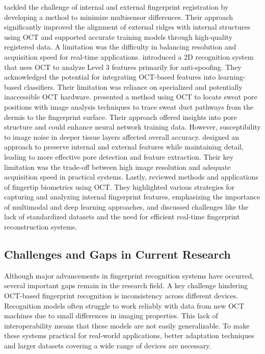 \textcite{yuNewApproachExternal2020} tackled the challenge of internal and external fingerprint registration by developing a method to minimize multisensor differences. Their approach significantly improved the alignment of external ridges with internal structures using OCT and supported accurate training models through high-quality registered data. A limitation was the difficulty in balancing resolution and acquisition speed for real-time applications. \textcite{liuRobustHighsecurityFingerprint2020} introduced a 2D recognition system that uses OCT to analyze Level 3 features primarily for anti-spoofing. They acknowledged the potential for integrating OCT-based features into learning-based classifiers. Their limitation was reliance on specialized and potentially inaccessible OCT hardware. \textcite{dingSubcutaneousSweatPore2021} presented a method using OCT to locate sweat pore positions with image analysis techniques to trace sweat duct pathways from the dermis to the fingerprint surface. Their approach offered insights into pore structure and could enhance neural network training data. However, susceptibility to image noise in deeper tissue layers affected overall accuracy. \textcite{liuNovelHighResolutionFingerprint2022} designed an approach to preserve internal and external features while maintaining detail, leading to more effective pore detection and feature extraction. Their key limitation was the trade-off between high image resolution and adequate acquisition speed in practical systems. Lastly, \textcite{sunNewApproachAutomated2023} reviewed methods and applications of fingertip biometrics using OCT. They highlighted various strategies for capturing and analyzing internal fingerprint features, emphasizing the importance of multimodal and deep learning approaches, and discussed challenges like the lack of standardized datasets and the need for efficient real-time fingerprint reconstruction systems.
\subsection{Challenges and Gaps in Current Research}
Although major advancements in fingerprint recognition systems have occurred, several important gaps remain in the research field. A key challenge hindering OCT-based fingerprint recognition is inconsistency across different devices. Recognition models often struggle to work reliably with data from new OCT machines due to small differences in imaging properties. This lack of interoperability means that these models are not easily generalizable. To make these systems practical for real-world applications, better adaptation techniques and larger datasets covering a wide range of devices are necessary. 

